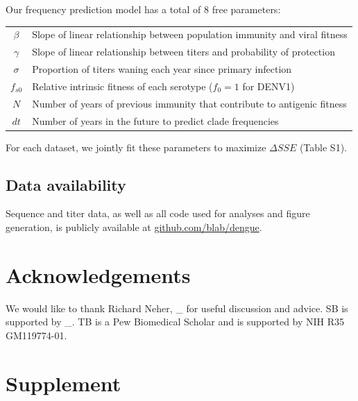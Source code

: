 \documentclass[11pt,oneside,letterpaper]{article}
\begin{document}
Our frequency prediction model has a total of 8 free parameters:
\begin{table}[h!]
  \begin{center}
    \label{parameter_definition}
    \begin{tabular}{c|l}
      $\beta$ & Slope of linear relationship between population immunity and viral fitness\\
      $\gamma$ & Slope of linear relationship between titers and probability of protection\\
      $\sigma$ & Proportion of titers waning each year since primary infection\\
      $f_{s0}$ & Relative intrinsic fitness of each serotype ($f_0 = 1$ for DENV1)\\
      $N$ & Number of years of previous immunity that contribute to antigenic fitness\\
      $dt$ & Number of years in the future to predict clade frequencies\\
    \end{tabular}
  \end{center}
\end{table}

For each dataset, we jointly fit these parameters to maximize $\Delta SSE$ (Table S1).

\subsection*{Data availability}
Sequence and titer data, as well as all code used for analyses and figure generation, is publicly available at \href{https://github.com/blab/dengue}{github.com/blab/dengue}.

\section*{Acknowledgements}
We would like to thank Richard Neher, \_ for useful discussion and advice.
SB is supported by \_.
TB is a Pew Biomedical Scholar and is supported by NIH R35 GM119774-01.

% 
% 

\newpage

\section*{Supplement}

\setcounter{figure}{0}
\setcounter{table}{0}
\renewcommand{\thefigure}{S\arabic{figure}}
\end{document}
